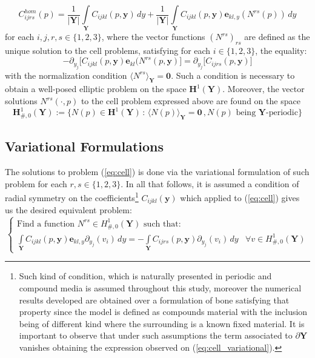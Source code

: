 \begin{equation}
    \label{eq:homogenized-coeff}
    C^{hom}_{ijrs}(p) = \frac{1}{\vert \mathbf{Y}\vert} \int\limits_{\mathbf{Y}} C_{ijkl}(p,\mathbf{y}) \, dy + \frac{1}{\vert \mathbf{Y}\vert} \int\limits_{\mathbf{Y}} C_{ijkl}(p,\mathbf{y}) \mathbf{e}_{kl,y}( N^{rs}(p))\,dy
\end{equation}
for each $ i,j,r,s \in \{1,2,3\}$, where the vector functions $(N^{rs})_{rs}$ are defined as the unique solution to the cell problems, satisfying for each $i \in \{1,2,3\}$, the equality:
\begin{equation}
    \label{eq:cell}
    -\partial_{y_j} \big[ C_{ijkl}(p,\mathbf{y}) \mathbf{e}_{kl}(N^{rs}(p,\mathbf{y}) \big] = \partial_{y_j} \big[ C_{ijrs}(p,\mathbf{y}) \big] 
\end{equation}
with the normalization condition $\langle N^{rs} \rangle_{\mathbf{Y}} = \mathbf{0}$. Such a condition is necessary to obtain a well-posed elliptic problem on the space $\mathbf{H}^1(\mathbf{Y})$.
Moreover, the vector solutions $N^{rs}(\cdot,p)$ to the cell problem expressed above are found on the space
\begin{equation*}
    \mathbf{H}^1_{\#, 0} (\mathbf{Y}) := \big \{ N(p) \in  \mathbf{H}^1(\mathbf{Y}) \, : \, \langle N(p) \rangle_{\mathbf{Y}}=\mathbf{0} \,, N(p) \text{ being } \mathbf{Y}\text{-periodic} \big \}
\end{equation*}

\subsection{Variational Formulations}
The solutions to problem (\ref{eq:cell}) is done via the variational formulation of such problem for each $r,s \in \{1,2,3\}$. In all that follows, it is assumed a condition of radial symmetry on the coefficients\footnote{Such kind of condition, which is naturally presented in periodic and compound media is assumed throughout this study, moreover the numerical results developed are obtained over a formulation of bone satisfying that property since the model is defined as compounds material with the inclusion being of different kind where the surrounding is a known fixed material. It is important to observe that under such assumptions the term associated to $\partial \mathbf{Y}$ vanishes obtaining the expression observed on (\ref{eq:cell_variational}).} $C_{ijkl}(\mathbf{y})$ which applied to (\ref{eq:cell}) gives us the desired equivalent problem:
\begin{equation}
    \label{eq:cell_variational}
    \left \{
    \begin{array}{cc}
        \text{Find a function        } N^{rs} \in H^1_{\#,0}(\mathbf{Y}) \text{ such that: } & \quad \\
        \int\limits_{\mathbf{Y}} C_{ijkl}(p,\mathbf{y})\mathbf{e}_{kl,y} \partial_{y_j}(v_i)\,dy = -\int\limits_{\mathbf{Y}} C_{ijrs}(p, \mathbf{y}) \partial_{y_j}(v_i)\,dy &  \forall v \in H^1_{\#, 0}(\mathbf{Y})
    \end{array}
    \right.
\end{equation}

